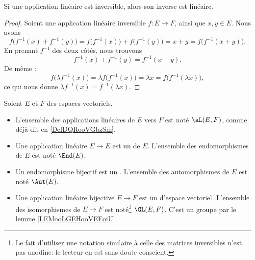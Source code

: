 \begin{lemma}       \label{LEMooLGEHooVEEoiU}
	Si une application linéaire est inversible, alors son inverse est linéaire.
\end{lemma}

\begin{proof}
	Soient une application linéaire inversible \( f\colon E\to F\), ainsi que \( x,y\in E\). Nous avons
	\begin{equation}
		f\big( f^{-1}(x)+f^{-1}(y) \big)=f\big( f^{-1}(x) \big)+f\big( f^{-1}(y) \big)=x+y=f\big( f^{-1}(x+y) \big).
	\end{equation}
	En prenant \( f^{-1}\) des deux côtés, nous trouvons
	\begin{equation}
		f^{-1}(x)+f^{-1}(y)=f^{-1}(x+y).
	\end{equation}
	De même :
	\begin{equation}
		f\big( \lambda f^{-1}(x) \big)=\lambda f\big( f^{-1}(x) \big)=\lambda x=f\big( f^{-1}(\lambda x) \big),
	\end{equation}
	ce qui nous donne \( \lambda f^{-1}(x)=f^{-1}(\lambda x)\).
\end{proof}


\begin{definition}       \label{DEFooOAOGooKuJSup}
	Soient \( E\) et \( F\) des espaces vectoriels.
	\begin{itemize}
		\item
		      L'ensemble des applications linéaires de \( E\) vers \( F\) est noté \( \aL(E,F)\), comme déjà dit en \ref{DefDQRooVGbzSm}.
		\item Une application linéaire \( E\to E\) est un  de \( E\). L'ensemble des endomorphismes de \( E\) est noté \( \End(E)\).
		\item Un endomorphisme bijectif est un . L'ensemble des automorphismes de \( E\) est noté \( \Aut(E)\).
		\item
		      Une application linéaire bijective \( E\to F\) est un  d'espace vectoriel. L'ensemble des isomorphismes de \( E\to F\) est noté\footnote{Le fait d'utiliser une notation similaire à celle des matrices inversibles n'est pas anodine: le lecteur en est sans doute conscient.} \( \GL(E,F)\). C'est un groupe par le lemme \ref{LEMooLGEHooVEEoiU}.
	\end{itemize}
\end{definition}

